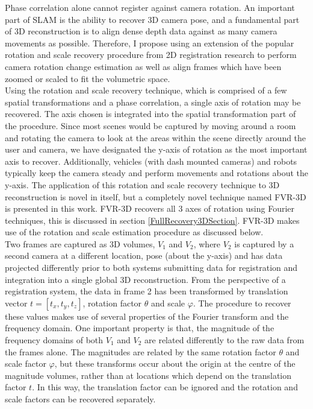 Phase correlation alone cannot register against camera rotation. An important part of SLAM is the ability to recover 3D camera pose, and a fundamental part of 3D reconstruction is to align dense depth data against as many camera movements as possible. Therefore, I propose using an extension of the popular rotation and scale recovery procedure from 2D registration research to perform camera rotation change estimation as well as align frames which have been zoomed or scaled to fit the volumetric space. \\

Using the rotation and scale recovery technique, which is comprised of a few spatial transformations and a phase correlation, a single axis of rotation may be recovered. The axis chosen is integrated into the spatial transformation part of the procedure. Since most scenes would be captured by moving around a room and rotating the camera to look at the areas within the scene directly around the user and camera, we have designated the y-axis of rotation as the most important axis to recover. Additionally, vehicles (with dash mounted cameras) and robots typically keep the camera steady and perform movements and rotations about the y-axis. The application of this rotation and scale recovery technique to 3D reconstruction is novel in itself, but a completely novel technique named FVR-3D is presented in this work. FVR-3D recovers all 3 axes of rotation using Fourier techniques, this is discussed in section \ref{FullRecovery3DSection}. FVR-3D makes use of the rotation and scale estimation procedure as discussed below.  \\


Two frames are captured as 3D volumes, $V_1$ and $V_2$, where $V_2$ is captured by a second camera at a different location, pose (about the y-axis) and has data projected differently prior to both systems submitting data for registration and integration into a single global 3D reconstruction. From the perspective of a registration system, the data in frame 2 has been transformed by translation vector $t = [t_x, t_y, t_z]$, rotation factor $\theta$ and scale $\varphi$. The procedure to recover these values makes use of several properties of the Fourier transform and the frequency domain. One important property is that, the magnitude of the frequency domains of both $V_1$ and $V_2$ are related differently to the raw data from the frames alone. The magnitudes are related by the same rotation factor $\theta$ and scale factor $\varphi$, but these transforms occur about the origin at the centre of the magnitude volumes, rather than at locations which depend on the translation factor $t$. In this way, the translation factor can be ignored and the rotation and scale factors can be recovered separately. \\

